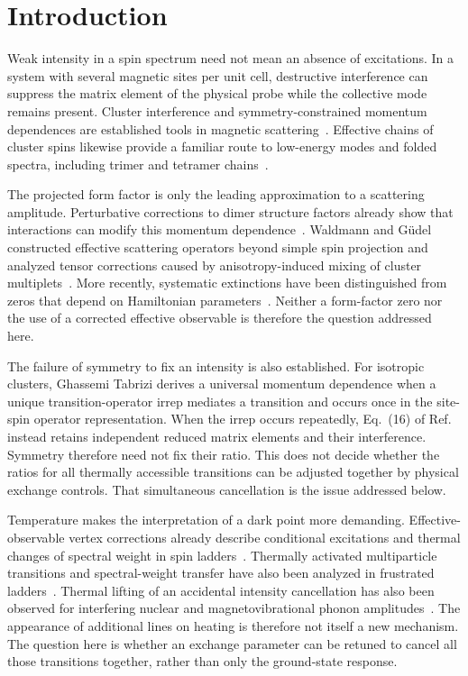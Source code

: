 \section{Introduction}

Weak intensity in a spin spectrum need not mean an absence of excitations.
In a system with several magnetic sites per unit cell, destructive interference
can suppress the matrix element of the physical probe while the collective
mode remains present. Cluster interference and symmetry-constrained
momentum dependences are established tools in magnetic
scattering~\cite{waldmann2003interference,haraldsen2011pentamer,tabrizi2021selection,tabrizi2021anisotropic}.
Effective chains of cluster spins likewise provide a familiar route to
low-energy modes and folded spectra, including trimer and tetramer
chains~\cite{cheng2022trimer,li2026tetramer}.

The projected form factor is only the leading approximation to a scattering
amplitude. Perturbative corrections to dimer structure factors already show
that interactions can modify this momentum dependence~\cite{mueller2003structure}.
Waldmann and G\"udel constructed effective scattering operators beyond simple
spin projection and analyzed tensor corrections caused by anisotropy-induced
mixing of cluster multiplets~\cite{waldmann2005manyspin}.
More recently, systematic extinctions have been distinguished from zeros that
depend on Hamiltonian parameters~\cite{tabrizi2026extinctions}.
Neither a form-factor zero nor the use of a corrected effective observable is
therefore the question addressed here.

The failure of symmetry to fix an intensity is also established.
For isotropic clusters, Ghassemi Tabrizi derives a universal momentum
dependence when a unique transition-operator irrep mediates a transition
and occurs once in the site-spin operator representation.
When the irrep occurs repeatedly, Eq.~(16) of
Ref.~ instead retains independent reduced
matrix elements and their interference. Symmetry therefore need not fix
their ratio. This does not decide whether the ratios for all thermally
accessible transitions can be adjusted together by physical exchange
controls. That simultaneous cancellation is the issue addressed below.

Temperature makes the interpretation of a dark point more demanding.
Effective-observable vertex corrections already describe conditional
excitations and thermal changes of spectral weight in spin
ladders~\cite{exius2010vertex}. Thermally activated multiparticle
transitions and spectral-weight transfer have also been analyzed in
frustrated ladders~\cite{honecker2016thermal}. Thermal lifting of an
accidental intensity cancellation has also been observed for interfering
nuclear and magnetovibrational phonon amplitudes~\cite{raymond2018interference}.
The appearance of additional lines on heating is therefore not itself a
new mechanism. The question
here is whether an exchange parameter can be retuned to cancel all those
transitions together, rather than only the ground-state response.

